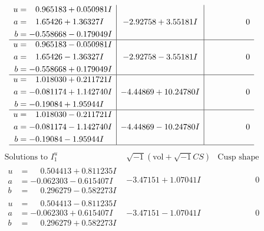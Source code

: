 \documentclass[1p]{elsarticle_modified}
\theoremstyle{definition}
\newcommand{\I}{\sqrt{-1}}
\begin{document}
$$\begin{array}{c|c|c}
\begin{aligned}
u &= \phantom{-}0.965183 + 0.050981 I \\
a &= \phantom{-}1.65426 + 1.36327 I \\
b &= -0.558668 - 0.179049 I\end{aligned}
 & -2.92758 + 3.55181 I & \phantom{-0.000000 } 0 \\ \hline\begin{aligned}
u &= \phantom{-}0.965183 - 0.050981 I \\
a &= \phantom{-}1.65426 - 1.36327 I \\
b &= -0.558668 + 0.179049 I\end{aligned}
 & -2.92758 - 3.55181 I & \phantom{-0.000000 } 0 \\ \hline\begin{aligned}
u &= \phantom{-}1.018030 + 0.211721 I \\
a &= -0.081174 + 1.142740 I \\
b &= -0.19084 + 1.95944 I\end{aligned}
 & -4.44869 + 10.24780 I & \phantom{-0.000000 } 0 \\ \hline\begin{aligned}
u &= \phantom{-}1.018030 - 0.211721 I \\
a &= -0.081174 - 1.142740 I \\
b &= -0.19084 - 1.95944 I\end{aligned}
 & -4.44869 - 10.24780 I & \phantom{-0.000000 } 0\\
 \hline 
 \end{array}$$\newpage$$\begin{array}{c|c|c}  
\text{Solutions to }I^u_{1}& \I (\text{vol} + \sqrt{-1}CS) & \text{Cusp shape}\\
 \hline 
\begin{aligned}
u &= \phantom{-}0.504413 + 0.811235 I \\
a &= -0.062303 - 0.615407 I \\
b &= \phantom{-}0.296279 - 0.582273 I\end{aligned}
 & -3.47151 + 1.07041 I & \phantom{-0.000000 } 0 \\ \hline\begin{aligned}
u &= \phantom{-}0.504413 - 0.811235 I \\
a &= -0.062303 + 0.615407 I \\
b &= \phantom{-}0.296279 + 0.582273 I\end{aligned}
 & -3.47151 - 1.07041 I & \phantom{-0.000000 } 0 \\ \hline\begin{aligned}

\end{aligned}
\end{array}$$
\end{document}
